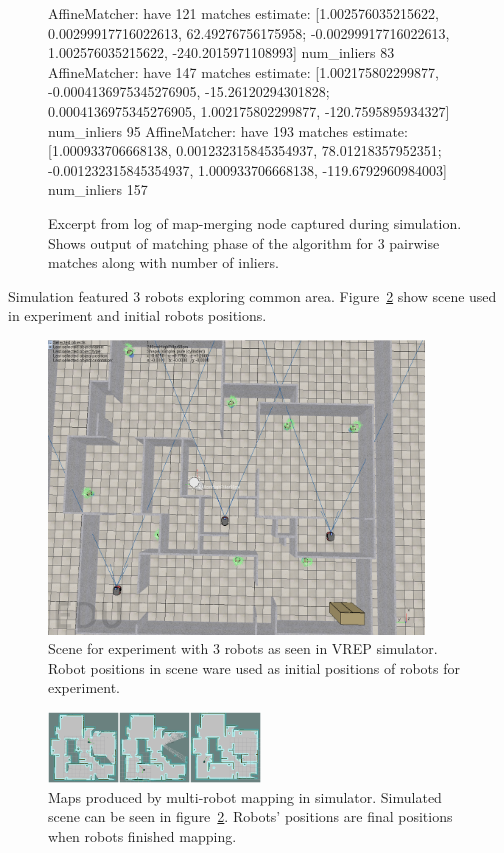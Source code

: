 \begin{figure}
    \centering
	\begin{code}
AffineMatcher: have 121 matches
estimate:
[1.002576035215622, 0.00299917716022613, 62.49276756175958;
 -0.00299917716022613, 1.002576035215622, -240.2015971108993]
num_inliers 83
AffineMatcher: have 147 matches
estimate:
[1.002175802299877, -0.0004136975345276905, -15.26120294301828;
 0.0004136975345276905, 1.002175802299877, -120.7595895934327]
num_inliers 95
AffineMatcher: have 193 matches
estimate:
[1.000933706668138, 0.001232315845354937, 78.01218357952351;
 -0.001232315845354937, 1.000933706668138, -119.6792960984003]
num_inliers 157
	\end{code}
    \caption{Excerpt from log of map-merging node captured during simulation. Shows output of matching phase of the algorithm for $3$ pairwise matches along with number of inliers.}
    \label{fig:minimal-overlapping-area-log}
\end{figure}


Simulation featured $3$ robots exploring common area. Figure~\ref{fig:minimal-overlapping-area-scene} show scene used in experiment and initial robots positions.

\begin{figure}
    \centering
    \includegraphics[width=3.93in]{../img/minimal-overlapping-area-scene.png}
    \caption{Scene for experiment with $3$ robots as seen in \gls{VREP} simulator. Robot positions in scene ware used as initial positions of robots for experiment.}
    \label{fig:minimal-overlapping-area-scene}
\end{figure}

\begin{figure}
    \centering
    \includegraphics[width=2.22in]{../img/minimal-overlapping-area-final-maps.png}
    \caption{Maps produced by multi-robot mapping in simulator. Simulated scene can be seen in figure~\ref{fig:minimal-overlapping-area-scene}. Robots' positions are final positions when robots finished mapping.}
    \label{fig:minimal-overlapping-area-final-maps}
\end{figure}

